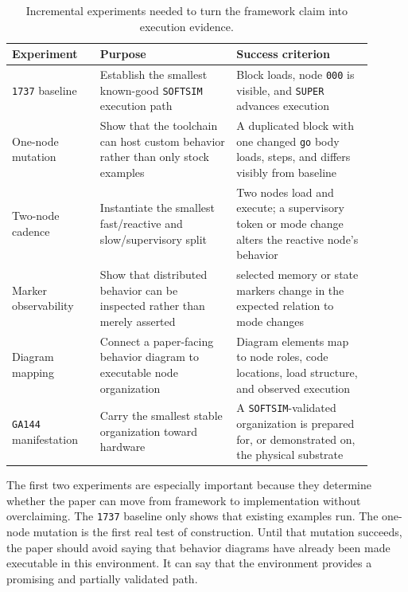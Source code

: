 \documentclass[11pt]{article}
\begin{document}
\begin{table}[ht]
\centering
\small
\begin{tabular}{>{\raggedright\arraybackslash}p{0.22\linewidth}
                >{\raggedright\arraybackslash}p{0.34\linewidth}
                >{\raggedright\arraybackslash}p{0.34\linewidth}}
\toprule
Experiment & Purpose & Success criterion \\
\midrule
\texttt{1737} baseline & Establish the smallest known-good
\texttt{SOFTSIM} execution path & Block loads, node \texttt{000} is visible,
and \texttt{SUPER} advances execution \\
One-node mutation & Show that the toolchain can host custom behavior rather
than only stock examples & A duplicated block with one changed \texttt{go}
body loads, steps, and differs visibly from baseline \\
Two-node cadence & Instantiate the smallest fast/reactive and
slow/supervisory split & Two nodes load and execute; a supervisory token or
mode change alters the reactive node's behavior \\
Marker observability & Show that distributed behavior can be inspected rather
than merely asserted & selected memory or state markers change in the
expected relation to mode changes \\
Diagram mapping & Connect a paper-facing behavior diagram to executable node
organization & Diagram elements map to node roles, code locations, load
structure, and observed execution \\
\texttt{GA144} manifestation & Carry the smallest stable organization toward
hardware & A \texttt{SOFTSIM}-validated organization is prepared for, or
demonstrated on, the physical substrate \\
\bottomrule
\end{tabular}
\caption{Incremental experiments needed to turn the framework claim into
execution evidence.}
\label{tab:experiment-plan}
\end{table}

The first two experiments are especially important because they determine
whether the paper can move from framework to implementation without
overclaiming. The \texttt{1737} baseline only shows that existing examples
run. The one-node mutation is the first real test of construction. Until
that mutation succeeds, the paper should avoid saying that behavior
diagrams have already been made executable in this environment. It can say
that the environment provides a promising and partially validated path.
\end{document}
